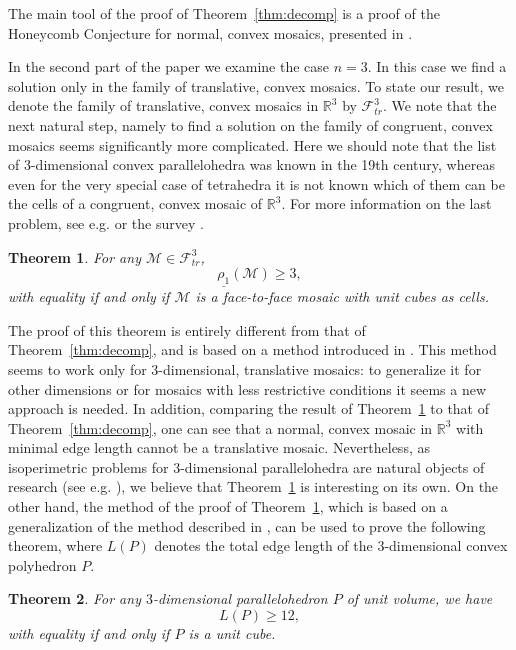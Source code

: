 \documentclass[twoside]{amsart}
\newtheorem{thm}{Theorem}
\theoremstyle{definition}
\renewcommand{\Re}{\mathbb R}
\newcommand{\M}{\mathcal{M}}
\newcommand{\F}{\mathcal{F}}
\begin{document}
The main tool of the proof of Theorem~\ref{thm:decomp} is a proof of the Honeycomb Conjecture for normal, convex mosaics, presented in \cite{LW2025}.

In the second part of the paper we examine the case $n=3$. In this case we find a solution only in the family of translative, convex mosaics. To state our result, we denote the family of translative, convex mosaics in $\Re^3$ by $\F_{tr}^3$. We note that the next natural step, namely to find a solution on the family of congruent, convex mosaics seems significantly more complicated. Here we should note that the list of $3$-dimensional convex parallelohedra was known in the 19th century, whereas even for the very special case of tetrahedra it is not known which of them can be the cells of a congruent, convex mosaic of $\Re^3$. For more information on the last problem, see e.g. \cite{BDKS, Edmonds, GGHMMPW} or the survey \cite{Senechal}.

\begin{thm}\label{thm:1}
For any $\M \in \F_{tr}^3$,
\[
\underline{\rho_1}(\M) \geq 3,
\]
with equality if and only if $\M$ is a face-to-face mosaic with unit cubes as cells.
\end{thm}

The proof of this theorem is entirely different from that of Theorem~\ref{thm:decomp}, and is based on a method introduced in \cite{Langi}.
This method seems to work only for $3$-dimensional, translative mosaics: to generalize it for other dimensions or for mosaics with less restrictive conditions it seems a new approach is needed. In addition, comparing the result of Theorem~\ref{thm:1} to that of Theorem~\ref{thm:decomp}, one can see that a normal, convex mosaic in $\Re^3$ with minimal edge length cannot be a translative mosaic. Nevertheless, as isoperimetric problems for $3$-dimensional parallelohedra are natural objects of research (see e.g. \cite{Bezdek, Langi}), we believe that Theorem~\ref{thm:1} is interesting on its own.
On the other hand, the method of the proof of Theorem~\ref{thm:1}, which is based on a generalization of the method described in \cite{Langi}, can be used to prove the following theorem, where $L(P)$ denotes the total edge length of the $3$-dimensional convex polyhedron $P$.

\begin{thm}\label{thm:totaledgelength}
For any $3$-dimensional parallelohedron $P$ of unit volume, we have
\[
L(P) \geq 12,
\]
with equality if and only if $P$ is a unit cube.
\end{thm}
\end{document}
